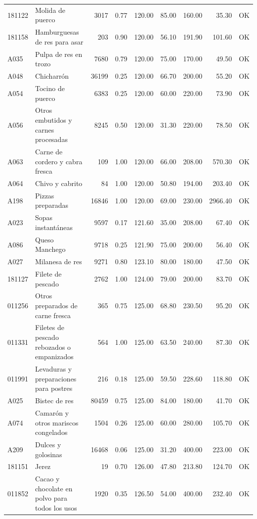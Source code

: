\begin{table}[ht]
\begin{tabular}{llrrrrrrl}
  181122 & Molida de puerco & 3017 & 0.77 & 120.00 & 85.00 & 160.00 & 35.30 & OK \\ 
  181158 & Hamburguesas de res para asar & 203 & 0.90 & 120.00 & 56.10 & 191.90 & 101.60 & OK \\ 
  A035 & Pulpa de res en trozo & 7680 & 0.79 & 120.00 & 75.00 & 170.00 & 49.50 & OK \\ 
  A048 & Chicharrón & 36199 & 0.25 & 120.00 & 66.70 & 200.00 & 55.20 & OK \\ 
  A054 & Tocino de puerco & 6383 & 0.25 & 120.00 & 60.00 & 220.00 & 73.90 & OK \\ 
  A056 & Otros embutidos y carnes procesadas & 8245 & 0.50 & 120.00 & 31.30 & 220.00 & 78.50 & OK \\ 
  A063 & Carne de cordero y cabra fresca & 109 & 1.00 & 120.00 & 66.00 & 208.00 & 570.30 & OK \\ 
  A064 & Chivo y cabrito &  84 & 1.00 & 120.00 & 50.80 & 194.00 & 203.40 & OK \\ 
  A198 & Pizzas preparadas & 16846 & 1.00 & 120.00 & 69.00 & 230.00 & 2966.40 & OK \\ 
  A023 & Sopas instantáneas & 9597 & 0.17 & 121.60 & 35.00 & 208.00 & 67.40 & OK \\ 
  A086 & Queso Manchego & 9718 & 0.25 & 121.90 & 75.00 & 200.00 & 56.40 & OK \\ 
  A027 & Milanesa de res & 9271 & 0.80 & 123.10 & 80.00 & 180.00 & 47.50 & OK \\ 
  181127 & Filete de pescado & 2762 & 1.00 & 124.00 & 79.00 & 200.00 & 83.70 & OK \\ 
  011256 & Otros preparados de carne fresca & 365 & 0.75 & 125.00 & 68.80 & 230.50 & 95.20 & OK \\ 
  011331 & Filetes de pescado rebozados o empanizados & 564 & 1.00 & 125.00 & 63.50 & 240.00 & 87.30 & OK \\ 
  011991 & Levaduras y preparaciones para postres & 216 & 0.18 & 125.00 & 59.50 & 228.60 & 118.80 & OK \\ 
  A025 & Bistec de res & 80459 & 0.75 & 125.00 & 84.00 & 180.00 & 41.70 & OK \\ 
  A074 & Camarón y otros mariscos congelados & 1504 & 0.26 & 125.00 & 60.00 & 280.00 & 105.70 & OK \\ 
  A209 & Dulces y golosinas & 16468 & 0.06 & 125.00 & 31.20 & 400.00 & 223.00 & OK \\ 
  181151 & Jerez &  19 & 0.70 & 126.00 & 47.80 & 213.80 & 124.70 & OK \\ 
  011852 & Cacao y chocolate en polvo para todos los usos & 1920 & 0.35 & 126.50 & 54.00 & 400.00 & 232.40 & OK \\ 

\end{tabular}
\end{table}
